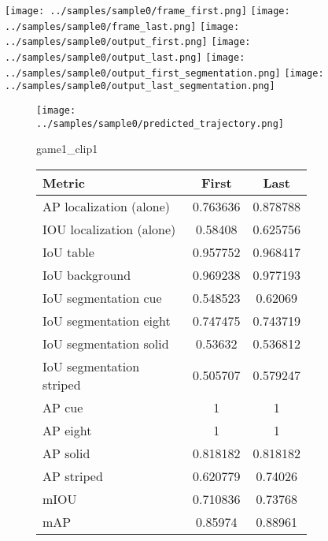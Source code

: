 \begin{figure}
\texttt{[image: ../samples/sample0/frame\_first.png]}
\texttt{[image: ../samples/sample0/frame\_last.png]}
\newline
\texttt{[image: ../samples/sample0/output\_first.png]}
\texttt{[image: ../samples/sample0/output\_last.png]}
\newline
\texttt{[image: ../samples/sample0/output\_first\_segmentation.png]}
\texttt{[image: ../samples/sample0/output\_last\_segmentation.png]}
\newline
\begin{subfigure}[b]{0.49\textwidth}
    \vspace{20pt}
    \texttt{[image: ../samples/sample0/predicted\_trajectory.png]}
    \caption*{game1\_clip1}
\end{subfigure}
\begin{subfigure}[b]{0.49\textwidth}
\begin{tabular}{|l|c|c|}
    \hline
    \textbf{Metric} & \textbf{First} & \textbf{Last} \\
    \hline
    AP localization (alone) & 0.763636 & 0.878788 \\ 
    IOU localization (alone) & 0.58408 & 0.625756 \\ 
    \hline
    IoU table & 0.957752 & 0.968417 \\ 
    IoU background & 0.969238 & 0.977193 \\ 
    \hline
    IoU segmentation cue & 0.548523 & 0.62069 \\ 
    IoU segmentation eight & 0.747475 & 0.743719 \\ 
    IoU segmentation solid & 0.53632 & 0.536812 \\ 
    IoU segmentation striped & 0.505707 & 0.579247 \\ 
    \hline
    AP cue & 1 & 1 \\ 
    AP eight & 1 & 1 \\ 
    AP solid & 0.818182 & 0.818182 \\ 
    AP striped & 0.620779 & 0.74026 \\ 
    \hline
    mIOU & 0.710836 & 0.73768 \\ 
    mAP & 0.85974 & 0.88961 \\ 
    \hline
\end{tabular}
\end{subfigure}
\end{figure}

